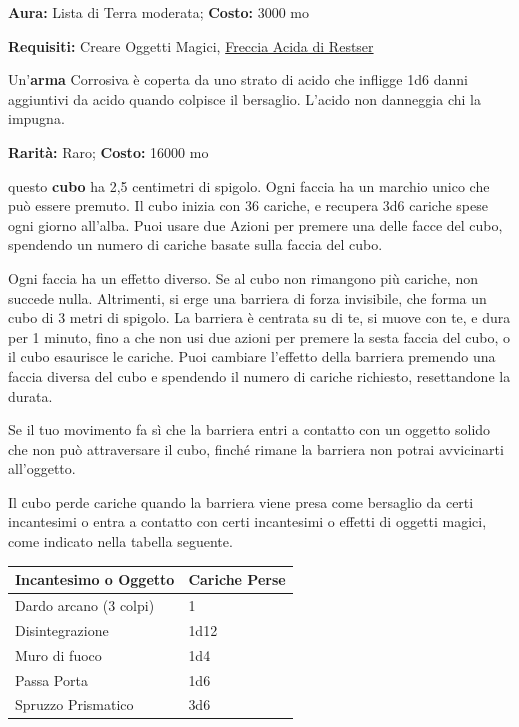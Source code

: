 \begin{multicols}{2}

\textbf{Aura:} Lista di Terra moderata; \textbf{Costo:} 3000 mo

\textbf{Requisiti:} Creare Oggetti Magici, \hyperlink{Freccia Acida di Restser}{Freccia Acida di Restser}

Un'\textbf{arma} Corrosiva è coperta da uno strato di acido che infligge 1d6 danni aggiuntivi da acido quando colpisce il bersaglio. L'acido non danneggia chi la impugna.


\textbf{Rarità:} Raro; \textbf{Costo:} 16000 mo

questo \textbf{cubo} ha 2,5 centimetri di spigolo. Ogni faccia ha un marchio unico che può essere premuto. Il cubo inizia con 36 cariche, e recupera 3d6 cariche spese ogni giorno all'alba. Puoi usare due Azioni per premere una delle facce del cubo, spendendo un numero di cariche basate sulla faccia del cubo.

Ogni faccia ha un effetto diverso. Se al cubo non rimangono più cariche, non succede nulla. Altrimenti, si erge una barriera di forza invisibile, che forma un cubo di 3 metri di spigolo. La barriera è centrata su di te, si muove con te, e dura per 1 minuto, fino a che non usi due azioni per premere la sesta faccia del cubo, o il cubo esaurisce le cariche. Puoi cambiare l'effetto della barriera premendo una faccia diversa del cubo e spendendo il numero di cariche richiesto, resettandone la durata.

Se il tuo movimento fa sì che la barriera entri a contatto con un oggetto solido che non può attraversare il cubo, finché rimane la barriera non potrai avvicinarti all'oggetto.

Il cubo perde cariche quando la barriera viene presa come bersaglio da certi incantesimi o entra a contatto con certi incantesimi o effetti di oggetti magici, come indicato nella tabella seguente.

\medskip

\noindent\begin{tabularx}{\linewidth}{ll}
	\toprule
\rowcolor{gray!20}\textbf{Incantesimo o Oggetto} &\textbf{Cariche Perse}\\
\toprule
Dardo arcano (3 colpi) &1\\
\rowcolor{gray!20}Disintegrazione &1d12\\
Muro di fuoco &1d4\\
\rowcolor{gray!20}Passa Porta& 1d6\\
Spruzzo Prismatico &3d6
\end{tabularx}


\end{multicols}
